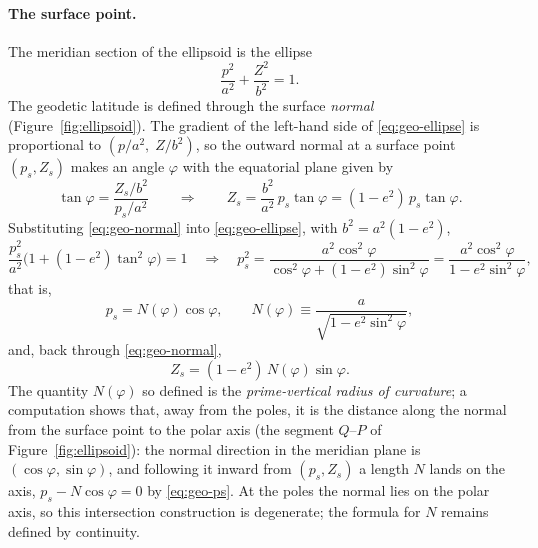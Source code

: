 \begin{revblock}
\paragraph{The surface point.}
The meridian section of the ellipsoid is the ellipse
\begin{equation}
\label{eq:geo-ellipse}
\frac{p^2}{a^2}+\frac{Z^2}{b^2}=1 .
\end{equation}
The geodetic latitude is defined through the surface \emph{normal}
(Figure~\ref{fig:ellipsoid}). The gradient of the left-hand side of
\eqref{eq:geo-ellipse} is proportional to $(p/a^2,\;Z/b^2)$, so the outward normal at a
surface point $(p_s,Z_s)$ makes an angle $\varphi$ with the equatorial plane given by
\begin{equation}
\label{eq:geo-normal}
\tan\varphi=\frac{Z_s/b^2}{p_s/a^2}
\qquad\Longrightarrow\qquad
Z_s=\frac{b^2}{a^2}\,p_s\tan\varphi=(1-e^2)\,p_s\tan\varphi .
\end{equation}
Substituting \eqref{eq:geo-normal} into \eqref{eq:geo-ellipse}, with $b^2=a^2(1-e^2)$,
\begin{equation}
\frac{p_s^2}{a^2}\Big(1+(1-e^2)\tan^2\varphi\Big)=1
\quad\Longrightarrow\quad
p_s^{2}=\frac{a^2\cos^2\varphi}{\cos^2\varphi+(1-e^2)\sin^2\varphi}
       =\frac{a^2\cos^2\varphi}{1-e^2\sin^2\varphi},
\end{equation}
that is,
\begin{equation}
\label{eq:geo-ps}
p_s=N(\varphi)\cos\varphi,
\qquad
N(\varphi)\equiv\frac{a}{\sqrt{1-e^2\sin^2\varphi}},
\end{equation}
and, back through \eqref{eq:geo-normal},
\begin{equation}
\label{eq:geo-zs}
Z_s=(1-e^2)\,N(\varphi)\sin\varphi .
\end{equation}
The quantity $N(\varphi)$ so defined is the \emph{prime-vertical radius of curvature}; a
computation shows that, away from the poles, it is the distance along the normal
from the surface point to the polar axis (the segment $Q$--$P$ of Figure~\ref{fig:ellipsoid}): the normal
direction in the meridian plane is $(\cos\varphi,\sin\varphi)$, and following it inward
from $(p_s,Z_s)$ a length $N$ lands on the axis,
$p_s-N\cos\varphi=0$ by \eqref{eq:geo-ps}. At the poles the normal lies on the
polar axis, so this intersection construction is degenerate; the formula for $N$
remains defined by continuity.


\end{revblock}
